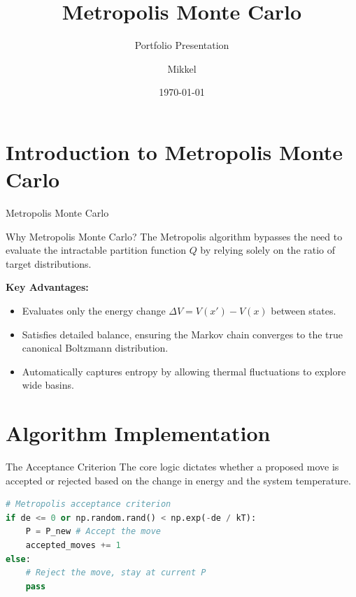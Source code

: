 \documentclass[aspectratio=169]{beamer}
\title[Computational Physics]{Metropolis Monte Carlo}
\subtitle{Portfolio Presentation}
\author{Mikkel}
\institute[Aarhus University]{Department of Physics and Astronomy}
\date{\today}
\begin{document}
\begin{frame}
    \titlepage
\end{frame}


\section{Introduction to Metropolis Monte Carlo}
\begin{frame}{Metropolis Monte Carlo}
    
\end{frame}
\begin{frame}{Why Metropolis Monte Carlo?}
    The Metropolis algorithm bypasses the need to evaluate the intractable partition function $Q$ by relying solely on the ratio of target distributions.
    
    \vspace{0.5cm}
    \textbf{Key Advantages:}
    \begin{itemize}
        \item Evaluates only the energy change $\Delta V = V(x') - V(x)$ between states.
        \item Satisfies detailed balance, ensuring the Markov chain converges to the true canonical Boltzmann distribution.
        \item Automatically captures entropy by allowing thermal fluctuations to explore wide basins.
    \end{itemize}
\end{frame}

\section{Algorithm Implementation}
\begin{frame}[fragile]{The Acceptance Criterion}
    The core logic dictates whether a proposed move is accepted or rejected based on the change in energy and the system temperature.
    
    \vspace{0.3cm}
    \begin{lstlisting}[language=Python]
# Metropolis acceptance criterion
if de <= 0 or np.random.rand() < np.exp(-de / kT):
    P = P_new # Accept the move
    accepted_moves += 1
else:
    # Reject the move, stay at current P
    pass 
    \end{lstlisting}
\end{frame}
\end{document}
